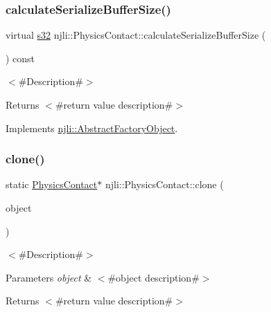 \subsubsection{\texorpdfstring{calculate\+Serialize\+Buffer\+Size()}{calculateSerializeBufferSize()}}
{\footnotesize\ttfamily virtual \mbox{\hyperlink{_util_8h_aa62c75d314a0d1f37f79c4b73b2292e2}{s32}} njli\+::\+Physics\+Contact\+::calculate\+Serialize\+Buffer\+Size (\begin{DoxyParamCaption}{ }\end{DoxyParamCaption}) const\hspace{0.3cm}{\ttfamily [virtual]}}

$<$\#\+Description\#$>$

\begin{DoxyReturn}{Returns}
$<$\#return value description\#$>$ 
\end{DoxyReturn}


Implements \mbox{\hyperlink{classnjli_1_1_abstract_factory_object_a4763d05bc9dc37c559111f8bb30e1dd8}{njli\+::\+Abstract\+Factory\+Object}}.

\mbox{\label{classnjli_1_1_physics_contact_a9d1f5b1074cee4a7c8edd683c4be9f78}} 
\subsubsection{\texorpdfstring{clone()}{clone()}}
{\footnotesize\ttfamily static \mbox{\hyperlink{classnjli_1_1_physics_contact}{Physics\+Contact}}$\ast$ njli\+::\+Physics\+Contact\+::clone (\begin{DoxyParamCaption}\item[{const \mbox{\hyperlink{classnjli_1_1_physics_contact}{Physics\+Contact}} \&}]{object }\end{DoxyParamCaption})\hspace{0.3cm}{\ttfamily [static]}}

$<$\#\+Description\#$>$


\begin{DoxyParams}{Parameters}
{\em object} & $<$\#object description\#$>$\\
\hline
\end{DoxyParams}
\begin{DoxyReturn}{Returns}
$<$\#return value description\#$>$ 
\end{DoxyReturn}
\mbox{\label{classnjli_1_1_physics_contact_acc8b8748ef094f7d05d3b84b64979136}} 
